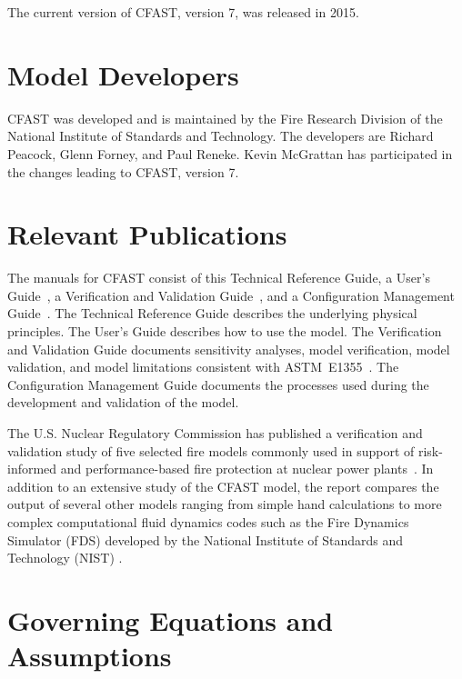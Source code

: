 \documentclass[12pt,twoside]{book}
\begin{document}
The current version of CFAST, version 7, was released in 2015.


\section{Model Developers}

CFAST was developed and is maintained by the Fire Research Division of the National Institute of Standards and Technology. The developers are Richard Peacock, Glenn Forney, and Paul Reneke. Kevin McGrattan has participated in the changes leading to CFAST, version 7.

\section{Relevant Publications}

The manuals for CFAST consist of this Technical Reference Guide, a User's Guide~\cite{CFAST_Users_Guide_7}, a Verification and Validation Guide~\cite{CFAST_Valid_Guide_7}, and a Configuration Management Guide~\cite{CFAST_Config_Guide_7}.  The Technical Reference Guide describes the underlying physical principles. The User's Guide describes how to use the model. The Verification and Validation Guide documents sensitivity analyses, model verification, model validation, and model limitations consistent with ASTM~E1355~\cite{ASTM:E1355}. The Configuration Management Guide documents the processes used during the development and validation of the model.

The U.S. Nuclear Regulatory Commission has published a verification and validation study of five selected fire models commonly used in support of risk-informed and performance-based fire protection at nuclear power plants~\cite{NRCNUREG1824}. In addition to an extensive study of the CFAST model, the report compares the output of several other models ranging from simple hand calculations to more complex computational fluid dynamics codes such as the Fire Dynamics Simulator (FDS) developed by the National Institute of Standards and Technology (NIST) \cite{FDS_Tech_Guide_6}.


\section{Governing Equations and Assumptions}
\end{document}
